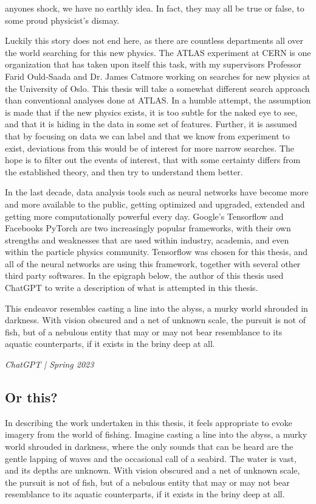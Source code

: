 anyones shock, we have no earthly idea. In fact, they may all be true or false, to some proud 
physicist's dismay. \par Luckily this story does not end here, as there are countless departments all 
over the world searching for this new physics. The ATLAS experiment at CERN is one organization that 
has taken upon itself this task, with my supervisors Professor Farid Ould-Saada and Dr. James Catmore working 
on searches for new physics at the University of Oslo. This thesis will take a somewhat different search 
approach than conventional analyses done at ATLAS. In a humble attempt, the assumption is made that 
if the new physics exists, it is too subtle for the naked eye to see, and that it is hiding in the data
in some set of features. Further, it is assumed that by focusing on data we can label and that we know 
from experiment to exist, deviations from this would be of interest for more narrow searches. The hope is 
to filter out the events of interest, that with some certainty differs from the established theory, 
and then try to understand them better. \par 
In the last decade, data analysis tools such as neural networks have become more and more available 
to the public, getting optimized and upgraded, extended and getting more computationally powerful every 
day. Google's Tensorflow\cite{tensorflow-whitepaper} and Facebooks PyTorch\cite{paszkepytorch} 
are two increasingly popular frameworks, with their own strengths and weaknesses that are used within industry, 
academia, and even within the particle physics community. Tensorflow was chosen for this thesis, and 
all of the neural networks are using this framework, together with several other third party softwares. 
In the epigraph below, the author of this thesis used ChatGPT to write a description of what is 
attempted in this thesis. 

\epigraph{
    This endeavor resembles casting a line into the abyss, a murky world 
shrouded in darkness. With vision obscured and a net of unknown scale, 
the pursuit is not of fish, but of a nebulous entity that may or may 
not bear resemblance to its aquatic counterparts, if it exists in 
the briny deep at all.}{\textit{ChatGPT | Spring 2023}}

\par \par 
\subsection*{Or this?}
In describing the work undertaken in this thesis, it feels appropriate to evoke imagery from the world of fishing. Imagine casting a line into the abyss, a murky world shrouded in darkness, where the only sounds that can be heard are the gentle lapping of waves and the occasional call of a seabird. The water is vast, and its depths are unknown. With vision obscured and a net of unknown scale, the pursuit is not of fish, but of a nebulous entity that may or may not bear resemblance to its aquatic counterparts, if it exists in the briny deep at all.

